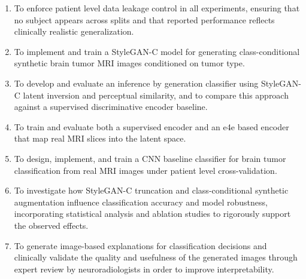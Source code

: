 \begin{enumerate}

    \item To enforce patient level data leakage control in all experiments, ensuring that no subject appears across splits and that reported performance reflects clinically realistic generalization.

    \item To implement and train a StyleGAN-C model for generating class-conditional synthetic brain tumor MRI images conditioned on tumor type.

    \item To develop and evaluate an inference by generation classifier using StyleGAN-C latent inversion and perceptual similarity, and to compare this approach against a supervised discriminative encoder baseline.

    \item To train and evaluate both a supervised encoder and an e4e based encoder that map real MRI slices into the latent space.
    
    \item To design, implement, and train a CNN baseline classifier for brain tumor classification from real MRI images under patient level cross-validation.
    
    \item To investigate how StyleGAN-C truncation and class-conditional synthetic augmentation influence classification accuracy and model robustness, incorporating statistical analysis and ablation studies to rigorously support the observed effects.

    \item To generate image-based explanations for classification decisions and clinically validate the quality and usefulness of the generated images through expert review by neuroradiologists in order to improve interpretability.

\end{enumerate}


